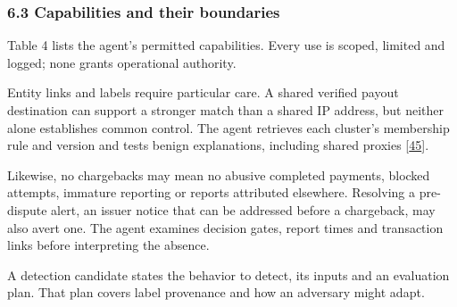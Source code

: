 \documentclass[
  11pt,
]{article}
\begin{document}
\hypertarget{capabilities-and-their-boundaries}{%
\subsubsection{6.3 Capabilities and their
boundaries}\label{capabilities-and-their-boundaries}}

Table 4 lists the agent's permitted capabilities. Every use is scoped,
limited and logged; none grants operational authority.

Entity links and labels require particular care. A shared verified
payout destination can support a stronger match than a shared IP
address, but neither alone establishes common control. The agent
retrieves each cluster's membership rule and version and tests benign
explanations, including shared proxies
{[}\protect\hyperlink{ref-Liu2018GEM}{45}{]}.

Likewise, no chargebacks may mean no abusive completed payments, blocked
attempts, immature reporting or reports attributed elsewhere. Resolving
a pre-dispute alert, an issuer notice that can be addressed before a
chargeback, may also avert one. The agent examines decision gates,
report times and transaction links before interpreting the absence.

A detection candidate states the behavior to detect, its inputs and an
evaluation plan. That plan covers label provenance and how an adversary
might adapt.
\end{document}
